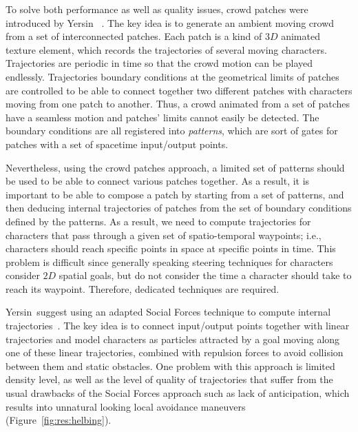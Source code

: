 To solve both performance as well as quality issues, crowd patches were introduced by Yersin \etal~\cite{Yersin:2009}.
The key idea is to generate an ambient moving crowd from a set of interconnected patches.
Each patch is a kind of $3D$ animated texture element, which records the trajectories of several moving characters.
Trajectories are periodic in time so that the crowd motion can be played endlessly.
Trajectories boundary conditions at the geometrical limits of patches are controlled to be able to connect together two different patches with characters moving from one patch to another.
Thus, a crowd animated from a set of patches have a seamless motion and patches' limits cannot easily be detected.
The boundary conditions are all registered into {\it patterns}, which are sort of gates for patches with a set of spacetime input/output points.

Nevertheless, using the crowd patches approach, a limited set of patterns should be used to be able to connect various patches together.
As a result, it is important to be able to compose a patch by starting from a set of patterns, and then deducing internal trajectories of patches from the set of boundary conditions defined by the patterns.
As a result, we need to compute trajectories for characters that pass through a given set of spatio-temporal waypoints; i.e., characters should reach specific points in space at specific points in time.
This problem is difficult since generally speaking steering techniques for characters consider $2D$ spatial goals, but do not consider the time a character should take to reach its waypoint.
Therefore, dedicated techniques are required. 

Yersin~\etal suggest using an adapted Social Forces technique to compute internal trajectories~\cite{Helbing:2005}.
The key idea is to connect input/output points together with linear trajectories and model characters as particles attracted by a goal moving along one of these linear trajectories, combined with repulsion forces to avoid collision between them and static obstacles.
One problem with this approach is limited density level, as well as the level of quality of trajectories that suffer from the usual drawbacks of the Social Forces approach such as lack of anticipation, which results into unnatural looking local avoidance maneuvers (Figure~\ref{fig:res:helbing}).

